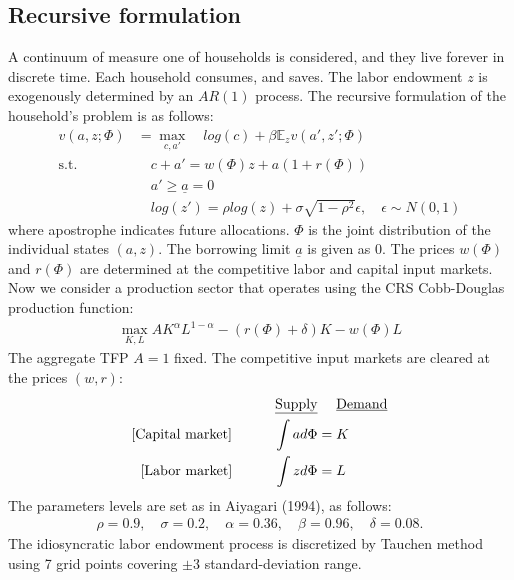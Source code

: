 \subsection*{Recursive formulation}
A continuum of measure one of households is considered, and they live forever in discrete time.
Each household consumes, and saves. The labor endowment $z$ is exogenously determined by an $AR(1)$ process. The recursive formulation of the household's problem is as follows:
\begin{align*}
  v(a,z;\Phi) &= \max_{c,a'} \quad log(c) + \beta \mathbb{E}_{z}v(a',z';\Phi)
  \\
  \text{s.t.}&\quad c + a' = w(\Phi)z + a(1+r(\Phi))
  \\
  &\quad a'\geq \underline{a} = 0
  \\
  &\quad log(z') = \rho log(z) + \sigma\sqrt{1-\rho^{2}}\epsilon,\quad \epsilon\sim N(0,1)
\end{align*}
where apostrophe indicates future allocations. $\Phi$ is the joint distribution of the individual states $(a,z)$. The borrowing limit $\underline{a}$ is given as $0$.
The prices $w(\Phi)$ and $r(\Phi)$ are determined at the competitive labor and capital input markets.
Now we consider a production sector that operates using the CRS Cobb-Douglas production function:
\begin{align*}
	\max_{K,L} A K^{\alpha}L^{1-\alpha} - (r(\Phi)+\delta)K - w(\Phi)L
\end{align*}
The aggregate TFP $A=1$ fixed.
The competitive input markets are cleared at the prices $(w,r)$:
\begin{align*}
	\text{\underline{Supply}}&\quad\text{ \underline{Demand}}
	\\
	\text{[Capital market]}\quad\qquad \int ad\Phi &= K
	\\
	\text{[Labor market]}\quad\qquad \int z d\Phi &= L
\end{align*}
The parameters levels are set as in Aiyagari (1994), as follows:
\begin{align*}
  \rho = 0.9,\quad \sigma = 0.2,\quad \alpha = 0.36,\quad \beta = 0.96, \quad \delta = 0.08.
\end{align*}
The idiosyncratic labor endowment process is discretized by Tauchen method using 7 grid points covering $\pm3$ standard-deviation range.